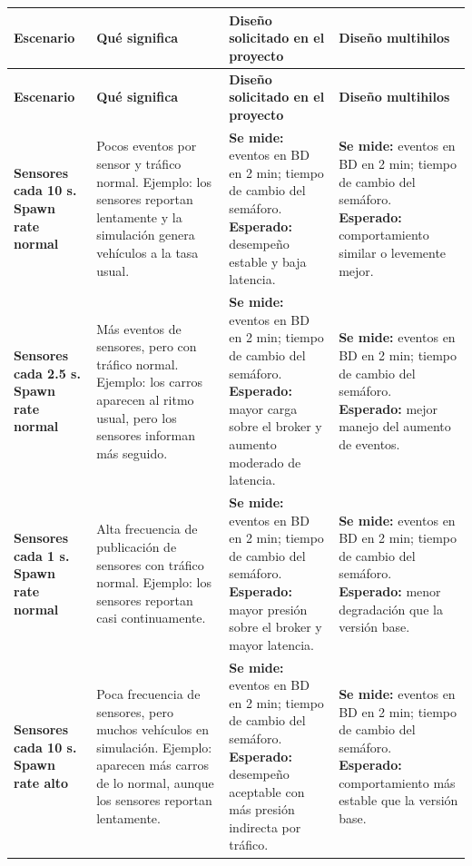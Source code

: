 \documentclass[12pt, a4paper]{article}
\begin{document}
\begin{footnotesize}
\sloppy
\renewcommand{\arraystretch}{1.35}
\setlength{\tabcolsep}{3pt}

\begin{longtable}{|L{2.6cm}|L{3.6cm}|L{3.6cm}|L{3.6cm}|}
\hline
\textbf{Escenario} & \textbf{Qué significa} & \textbf{Diseño solicitado en el proyecto} & \textbf{Diseño multihilos} \\
\hline
\endfirsthead

\hline
\textbf{Escenario} & \textbf{Qué significa} & \textbf{Diseño solicitado en el proyecto} & \textbf{Diseño multihilos} \\
\hline
\endhead

\textbf{Sensores cada 10 s. Spawn rate normal} &
Pocos eventos por sensor y tráfico normal. Ejemplo: los sensores reportan lentamente y la simulación genera vehículos a la tasa usual. &
\textbf{Se mide:} eventos en BD en 2 min; tiempo de cambio del semáforo. \textbf{Esperado:} desempeño estable y baja latencia. &
\textbf{Se mide:} eventos en BD en 2 min; tiempo de cambio del semáforo. \textbf{Esperado:} comportamiento similar o levemente mejor. \\
\hline

\textbf{Sensores cada 2.5 s. Spawn rate normal} &
Más eventos de sensores, pero con tráfico normal. Ejemplo: los carros aparecen al ritmo usual, pero los sensores informan más seguido. &
\textbf{Se mide:} eventos en BD en 2 min; tiempo de cambio del semáforo. \textbf{Esperado:} mayor carga sobre el broker y aumento moderado de latencia. &
\textbf{Se mide:} eventos en BD en 2 min; tiempo de cambio del semáforo. \textbf{Esperado:} mejor manejo del aumento de eventos. \\
\hline

\textbf{Sensores cada 1 s. Spawn rate normal} &
Alta frecuencia de publicación de sensores con tráfico normal. Ejemplo: los sensores reportan casi continuamente. &
\textbf{Se mide:} eventos en BD en 2 min; tiempo de cambio del semáforo. \textbf{Esperado:} mayor presión sobre el broker y mayor latencia. &
\textbf{Se mide:} eventos en BD en 2 min; tiempo de cambio del semáforo. \textbf{Esperado:} menor degradación que la versión base. \\
\hline

\textbf{Sensores cada 10 s. Spawn rate alto} &
Poca frecuencia de sensores, pero muchos vehículos en simulación. Ejemplo: aparecen más carros de lo normal, aunque los sensores reportan lentamente. &
\textbf{Se mide:} eventos en BD en 2 min; tiempo de cambio del semáforo. \textbf{Esperado:} desempeño aceptable con más presión indirecta por tráfico. &
\textbf{Se mide:} eventos en BD en 2 min; tiempo de cambio del semáforo. \textbf{Esperado:} comportamiento más estable que la versión base. \\
\hline


\end{longtable}
\end{footnotesize}
\end{document}
